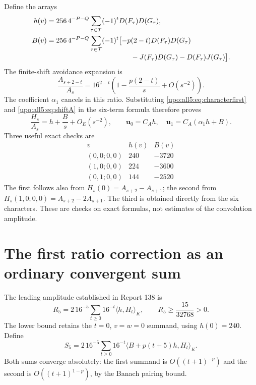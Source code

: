\documentclass[11pt,letterpaper]{article}
\theoremstyle{remark}\newtheorem{remark}[theorem]{Remark}
\numberwithin{equation}{section}
\newcommand{\pair}[2]{\langle #1,#2\rangle_K}
\newcommand{\Tset}{\mathcal T}
\newcommand{\bfU}{\boldsymbol u}
\begin{document}
Define the arrays
\begin{align}\label{upo:all5:eq:h}
 h(v)&=256\,4^{-P-Q}\sum_{\tau\in\Tset}(-1)^tD(F_\tau)D(G_\tau),\\
 B(v)&=256\,4^{-P-Q}\sum_{\tau\in\Tset}(-1)^t
 \bigl[-p(2-t)D(F_\tau)D(G_\tau)\notag\\[-2pt]
 &\hspace{42mm}-J(F_\tau)D(G_\tau)-D(F_\tau)J(G_\tau)\bigr].\label{upo:all5:eq:B}
\end{align}
The finite-shift avoidance expansion is
\begin{equation}\label{upo:all5:eq:shiftA}
 \frac{A_{s+2-t}}{A_s}
      =16^{2-t}\left(1-\frac{p(2-t)}s+O(s^{-2})\right).
\end{equation}
The coefficient $\alpha_1$ cancels in this ratio. Substituting
\eqref{upo:all5:eq:characterfirst} and \eqref{upo:all5:eq:shiftA} in the six-term formula
therefore proves
\begin{equation}\label{upo:all5:eq:half-first}
 \frac{H_s}{A_s}=h+\frac Bs+O_E(s^{-2}),\qquad
 \bfU_0=C_Ah,\quad \bfU_1=C_A(\alpha_1h+B).
\end{equation}
Three useful exact checks are
\begin{equation}\label{upo:all5:eq:checks-hB}
 \begin{array}{c|rr}
 v &h(v)&B(v)\\ \hline
 (0,0;0,0)&240&-3720\\
 (1,0;0,0)&224&-3600\\
 (0,1;0,0)&144&-2520
 \end{array}
\end{equation}
The first follows also from $H_s(0)=A_{s+2}-A_{s+1}$; the second
from $H_s(1,0;0,0)=A_{s+2}-2A_{s+1}$. The third is obtained directly
from the six characters. These are checks on exact formulas, not
estimates of the convolution amplitude.

\section{The first ratio correction as an ordinary convergent sum}\label{upo:all5:sec:firstratio}
The leading amplitude established in Report 138 is
\begin{equation}\label{upo:all5:eq:R5}
 R_5=2\,16^{-5}\sum_{t\ge0}16^{-t}\pair h{H_t},\qquad
 R_5\ge\frac{15}{32768}>0.
\end{equation}
The lower bound retains the $t=0$, $v=w=0$ summand, using
$h(0)=240$. Define
\begin{equation}\label{upo:all5:eq:S5}
 S_5=2\,16^{-5}\sum_{t\ge0}16^{-t}
                 \pair{B+p(t+5)h}{H_t}.
\end{equation}
Both sums converge absolutely: the first summand is $O((t+1)^{-p})$
and the second is $O((t+1)^{1-p})$, by the Banach pairing bound.
\end{document}
